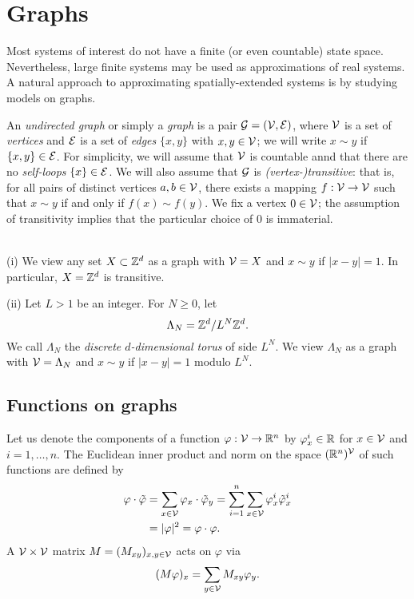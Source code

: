 \section{Graphs}

Most systems of interest do not have a finite (or even countable) state space.
Nevertheless, large finite systems may be used as approximations of real systems.
A natural approach to approximating spatially-extended systems is by studying
models on graphs.

An \emph{undirected graph} or simply a \emph{graph} is a pair $\mathcal{G} = (\mathcal{V}, \mathcal{E})$,
where $\mathcal{V}$
is a set of \emph{vertices} and $\mathcal{E}$ is a set of
\emph{edges} $\{ x, y \}$ with $x, y \in \mathcal{V}$; we will write $x \sim y$ if
$\{ x, y \} \in \mathcal{E}$.
For simplicity, we will assume that $\mathcal{V}$ is countable annd that there are no
\emph{self-loops} $\{ x \} \in \mathcal{E}$.
We will also assume that $\mathcal{G}$ is \emph{(vertex-)transitive}: that is, for all pairs
of distinct
vertices $a, b \in \mathcal{V}$, there exists a mapping $f : \mathcal{V} \rightarrow \mathcal{V}$
such that $x \sim y$ if and only if $f(x) \sim f(y)$.
We fix a vertex $0\in\mathcal{V}$; the assumption of transitivity implies
that the particular choice of $0$ is immaterial.

\begin{example}\mbox{}\\
\smallskip\noindent
(i) We view any set $X \subset { {{\mathbb Z}}^d }$ as a graph with $\mathcal{V} = X$ and
$x\sim y$ if $|x - y| = 1$. In particular, $X = { {{\mathbb Z}}^d }$ is transitive.

\smallskip\noindent
(ii) Let $L > 1$ be an integer. For $N \ge 0$, let
\begin{equation}
\Lambda_N = { {{\mathbb Z}}^d }/L^N{ {{\mathbb Z}}^d }.
\end{equation}
We call $\Lambda_N$ the \emph{discrete $d$-dimensional torus} of side $L^N$.
We view $\Lambda_N$ as a graph with $\mathcal{V} = \Lambda_N$ and $x \sim y$
if $|x - y| = 1$ modulo $L^N$.
\end{example}


\subsection{Functions on graphs}

Let us denote the components of a function $\varphi : \mathcal{V} \rightarrow {\mathbb R}^n$ by
$\varphi^i_x \in {\mathbb R}$ for $x \in \mathcal{V}$ and $i = 1, \ldots, n$.
The Euclidean inner product and norm on the space $({\mathbb R}^n)^{\mathcal{V}}$ of such functions
are defined by
\begin{align}
\varphi\cdot\tilde\varphi
	&= \sum_{x\in\mathcal{V}} \varphi_x \cdot \tilde\varphi_y
  		= \sum_{i=1}^n \sum_{x\in\mathcal{V}} \varphi^i_x \tilde\varphi^i_x \\
	&=|\varphi|^2 = \varphi \cdot \varphi.
\end{align}
A $\mathcal{V}\times\mathcal{V}$ matrix $M = (M_{xy})_{x,y\in\mathcal{V}}$ acts on $\varphi$ via
\begin{equation}
(M \varphi)_x = \sum_{y\in\mathcal{V}} M_{xy} \varphi_y.
\end{equation}

